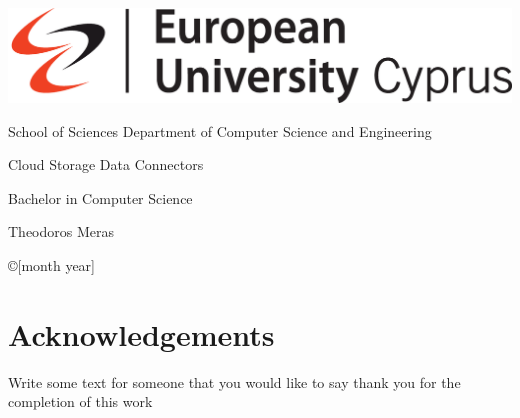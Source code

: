 \documentclass[12pt,a4paper]{report}
\begin{document}
    \thispagestyle{empty}
    {

    \noindent\includegraphics[scale=0.32]{images/euc}


        \begin{center}
            School of Sciences \textbar \; Department of Computer Science and Engineering
        \end{center}

        \vspace{1.5cm}
        \begin{center}
            \Huge  Cloud Storage Data Connectors
        \end{center}


        \vspace{0.2cm}

        \vspace{1.5cm}
        \begin{center}
            \LARGE Bachelor in Computer Science
        \end{center}


        \vspace{1.5cm}
        \begin{center}
            \Large Theodoros Meras
        \end{center}
        \vspace{1.5cm}

        \noindent
        \begin{center}
            \copyright  [month year]
        \end{center}
        \newpage
        \thispagestyle{empty}

    }%

    \section*{Acknowledgements}
    Write some text for someone that you would like to say thank you for the completion of this work

    \newpage
    

    \newpage
    
    
    
    
    
    


    
    

    
    
\end{document}
